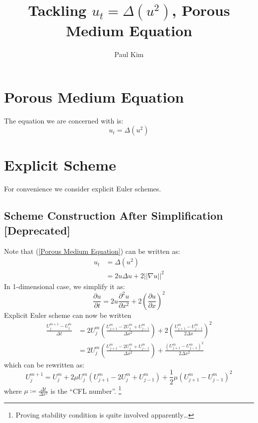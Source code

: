 \documentclass[a4paper]{article}
\title{Tackling $u_{t} = \Delta \left( u^2 \right)$, Porous Medium Equation}
\author{Paul Kim}
\begin{document}
\maketitle
\section{Porous Medium Equation}
The equation we are concerned with is:
\begin{equation}
    u_{t} = \Delta \left( u^2 \right)
    \label{Porous Medium Equation}
\end{equation}

\section{Explicit Scheme}
For convenience we consider explicit Euler schemes.

\subsection{Scheme Construction After Simplification [Deprecated]}
Note that (\ref{Porous Medium Equation}) can be written as:
\begin{align}
    u_t &= \Delta \left( u^2 \right) \\
    &= 2 u \Delta u + 2 || \nabla u ||^2
\end{align}
In 1-dimensional case, we simplify it as:
\begin{equation}
    \frac{\partial u}{\partial t} = 2 u \frac{\partial^2 u}{\partial x^2} + 2 \left( \frac{\partial u}{\partial x} \right)^2
\end{equation}
Explicit Euler scheme can now be written
\begin{align}
    \frac{U_j^{m+1} - U_j^m}{\Delta t}
    &= 2 U_j^m \left( \frac{U_{j+1}^m - 2 U_{j}^m + U_{j-1}^m}{\Delta x^2} \right)
    + 2 \left( \frac{U_{j+1}^m - U_{j-1}^m}{2 \Delta x} \right)^2 \\
    &= 2 U_j^m \left( \frac{U_{j+1}^m - 2 U_{j}^m + U_{j-1}^m}{\Delta x^2} \right)
    + \frac{\left( U_{j+1}^m - U_{j-1}^m \right)^2}{2 \Delta x^2}
\end{align}
which can be rewritten as:
\begin{equation}
    U_j^{m+1} = U_j^m + 2 \mu U_j^m \left( U_{j+1}^m - 2 U_{j}^m + U_{j-1}^m \right) 
    + \frac{1}{2} \mu \left( U_{j+1}^m - U_{j-1}^m \right)^2
\end{equation}
where $\mu \coloneqq \frac{\Delta t}{\Delta x^2}$ is the ``CFL number''.
\footnote{Proving stability condition is quite involved apparently\dots}
\end{document}

